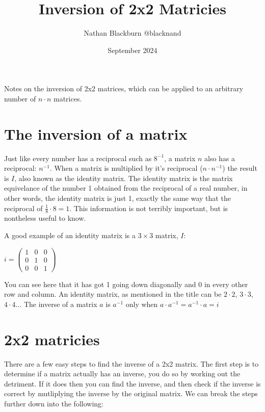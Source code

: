 \documentclass[options]{article}
\title{Inversion of 2x2 Matricies}
\author{Nathan Blackburn {@blacknand}}
\date{September 2024}
\begin{document}
\maketitle
Notes on the inversion of 2x2 matrices, which can be applied to an arbitrary number of \( n \cdot n \) matrices.
\vspace{-1em}
\section{The inversion of a matrix}
Just like every number has a reciprocal such as \(8^{-1}\), a matrix \(n\) also has a reciprocal: \(n^{-1}\). When a matrix
is multiplied by it's reciprocal (\(n \cdot n^{-1}\)) the result is \(I\), also known as the identity matrix. The identity matrix
is the matrix equivelance of the number 1 obtained from the reciprocal of a real number, in other words, the identity matrix is just 1, exactly the same
way that the reciprocal of \(\frac{1}{8} \cdot 8 = 1\). This information is not terribly important, but is nontheless useful to know.
\par


A good example of an identity matrix is a \( 3 \times 3 \) matrix, \( I \):

\begin{center}

    \(
        i = 
        \begin{pmatrix}
        1 & 0 & 0\\
        0 & 1 & 0\\
        0 & 0 & 1
        \end{pmatrix}
    \)

\end{center}

You can see here that it has got 1 going down diagonally and 0 in every other row and column. An identity
matrix, as mentioned in the title can be \(2 \cdot 2\), \(3 \cdot 3\), \(4 \cdot 4\)... The inverse of a matrix \(a\) is \(a^{-1}\) only when \(a \cdot a^{-1} = a^{-1} \cdot a = i\)

\section{2x2 matricies}
There are a few easy steps to find the inverse of a 2x2 matrix. The first step is to determine if a matrix actually has an inverse, you do so by working out the detriment. 
If it does then you can find the inverse, and then check if the inverse is correct by mutliplying the inverse by the original matrix. We can break the steps further down into the following:
\end{document}
